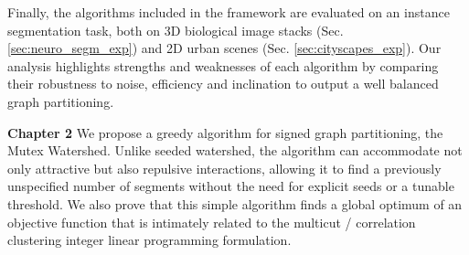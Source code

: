 Finally, the algorithms included in the framework are evaluated on an instance segmentation task, both on 3D biological image stacks (Sec. \ref{sec:neuro_segm_exp}) and 2D urban scenes (Sec. \ref{sec:cityscapes_exp}). Our analysis highlights strengths and weaknesses of each algorithm by comparing their robustness to noise, efficiency and inclination to output a well balanced graph partitioning.

\textbf{Chapter 2}
We propose a greedy algorithm for signed graph partitioning, the Mutex Watershed. Unlike seeded watershed, the algorithm can accommodate not only attractive but also repulsive interactions, allowing it to ﬁnd a previously unspeciﬁed number of segments without the need for explicit seeds or a tunable threshold. We also prove that this simple algorithm ﬁnds a global optimum of an objective function that is intimately related to the multicut / correlation clustering integer linear programming formulation.

